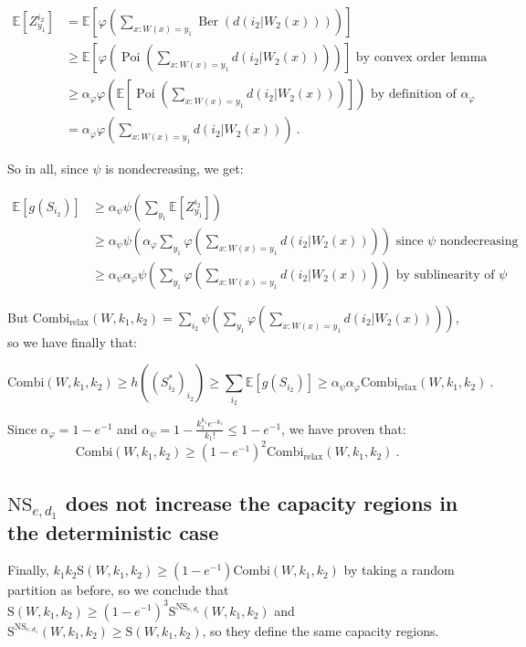 \documentclass[11pt]{article}
\theoremstyle{definition}
\theoremstyle{remark}
\DeclareMathOperator{\Poi}{\text{Poi}}
\DeclareMathOperator{\Ber}{\text{Ber}}
\begin{document}
\begin{equation}
  \begin{aligned}
    \mathbb{E}[Z^{i_2}_{y_1}] &= \mathbb{E}\left[\varphi\left(\sum_{x:W(x)=y_1}\Ber(d(i_2|W_2(x)))\right)\right]\\
    &\geq \mathbb{E}\left[\varphi\left(\Poi\left(\sum_{x:W(x)=y_1}d(i_2|W_2(x))\right)\right)\right] \text{ by convex order lemma}\\
    &\geq \alpha_{\varphi}\varphi\left(\mathbb{E}\left[\Poi\left(\sum_{x:W(x)=y_1}d(i_2|W_2(x))\right)\right]\right) \text{ by definition of $\alpha_{\varphi}$}\\
    &= \alpha_{\varphi}\varphi\left(\sum_{x:W(x)=y_1}d(i_2|W_2(x))\right) \ .
  \end{aligned}
\end{equation}

So in all, since $\psi$ is nondecreasing, we get:

\begin{equation}
  \begin{aligned}
    \mathbb{E}\left[g(S_{i_2})\right] &\geq \alpha_{\psi}\psi\left(\sum_{y_1}\mathbb{E}[Z^{i_2}_{y_1}]\right)\\
    &\geq \alpha_{\psi}\psi\left(\alpha_{\varphi}\sum_{y_1}\varphi\left(\sum_{x:W(x)=y_1}d(i_2|W_2(x))\right)\right) \text{ since $\psi$ nondecreasing}\\
    &\geq \alpha_{\psi}\alpha_{\varphi}\psi\left(\sum_{y_1}\varphi\left(\sum_{x:W(x)=y_1}d(i_2|W_2(x))\right)\right) \text{ by sublinearity of $\psi$}
  \end{aligned}
\end{equation}

But $\textrm{Combi}_{\text{relax}}(W,k_1,k_2) = \sum_{i_2}\psi\left(\sum_{y_1}\varphi\left(\sum_{x:W(x)=y_1}d(i_2|W_2(x))\right)\right)$, so we have finally that:

\[ \textrm{Combi}(W,k_1,k_2) \geq h((S^*_{i_2})_{i_2}) \geq \sum_{i_2} \mathbb{E}\left[g(S_{i_2})\right] \geq \alpha_{\psi}\alpha_{\varphi}\textrm{Combi}_{\text{relax}}(W,k_1,k_2) \ . \]

Since $\alpha_{\varphi} = 1-e^{-1}$ and $\alpha_{\psi} = 1 - \frac{k_1^{k_1}e^{-k_1}}{k_1!} \leq 1 -e^{-1}$, we have proven that:
\[ \textrm{Combi}(W,k_1,k_2) \geq (1-e^{-1})^2\textrm{Combi}_{\text{relax}}(W,k_1,k_2) \ .\]

\subsection{$\mathrm{NS}_{e,d_1}$ does not increase the capacity regions in the deterministic case}
Finally, $k_1k_2\mathrm{S}(W,k_1,k_2) \geq (1-e^{-1})\textrm{Combi}(W,k_1,k_2)$ by taking a random partition as before, so we conclude that $\mathrm{S}(W,k_1,k_2) \geq (1-e^{-1})^3\mathrm{S}^{\mathrm{NS}_{e,d_1}}(W,k_1,k_2)$ and $\mathrm{S}^{\mathrm{NS}_{e,d_1}}(W,k_1,k_2) \geq \mathrm{S}(W,k_1,k_2)$, so they define the same capacity regions.
\end{document}
